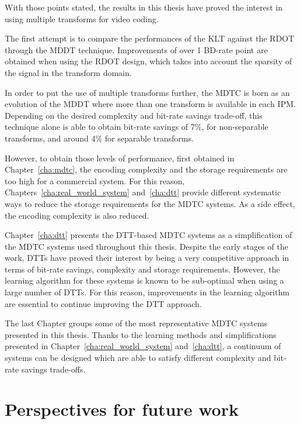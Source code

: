 \documentclass[11pt,a4paper,openright,twoside]{book}
\numberwithin{equation}{section} %
\numberwithin{figure}{section} %
\numberwithin{table}{section} %
\begin{document}
With those points stated, the results in this thesis have proved the interest
in using multiple transforms for video coding.

The first attempt is to compare the performances of the \ac{KLT} against the
\ac{RDOT} through the \ac{MDDT} technique.
Improvements of over 1 \ac{BD}-rate point are obtained when using the
\ac{RDOT} design, which takes into account the sparsity of the signal in the
transform domain.

In order to put the use of multiple transforms further, the \ac{MDTC} is born
as an evolution of the \ac{MDDT} where more than one transform is available in
each \ac{IPM}.
Depending on the desired complexity and bit-rate savings trade-off, this
technique alone is able to obtain bit-rate savings of 7\%, for non-separable
transforms, and around 4\% for separable transforms.

However, to obtain those levels of performance, first obtained in
Chapter~\ref{cha:mdtc}, the encoding complexity and the storage requirements
are too high for a commercial system.
For this reason, Chapters~\ref{cha:real_world_system} and~\ref{cha:dtt}
provide different systematic ways to reduce the storage requirements for the
\ac{MDTC} systems.
As a side effect, the encoding complexity is also reduced.

Chapter~\ref{cha:dtt} presents the \ac{DTT}-based \ac{MDTC} systems as a
simplification of the \ac{MDTC} systems used throughout this thesis.
Despite the early stages of the work, \acp{DTT} have proved their interest by
being a very competitive approach in terms of bit-rate savings, complexity and
storage requirements.
However, the learning algorithm for these systems is known to be sub-optimal
when using a large number of \acp{DTT}.
For this reason, improvements in the learning algorithm are essential to
continue improving the \ac{DTT} approach.

The last Chapter groups some of the most representative \ac{MDTC} systems
presented in this thesis.
Thanks to the learning methods and simplifications presented in
Chapter~\ref{cha:real_world_system} and~\ref{cha:dtt}, a continuum of systems
can be designed which are able to satisfy different complexity and bit-rate
savings trade-offs.

\section*{Perspectives for future work}
\label{sec:perspectives_for_future_work}
\end{document}
